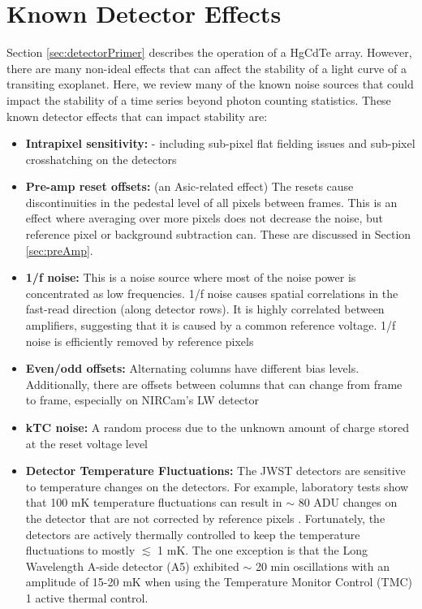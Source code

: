 \documentclass{aastex62}
\begin{document}
\section{Known Detector Effects}\label{sec:knownEffects}
Section \ref{sec:detectorPrimer} describes the operation of a HgCdTe array.
However, there are many non-ideal effects that can affect the stability of a light curve of a transiting exoplanet.
Here, we review many of the known noise sources that could impact the stability of a time series beyond photon counting statistics. These known detector effects that can impact stability are:

\begin{itemize}[noitemsep]
	\item \textbf{Intrapixel sensitivity:} - including sub-pixel flat fielding issues and sub-pixel crosshatching on the detectors \citep{shapiro2018crosshatch}
	\item \textbf{Pre-amp reset offsets:} (an Asic-related effect) 
The resets cause discontinuities in the pedestal level of all pixels between frames. This is an effect where averaging over more pixels does not decrease the noise, but reference pixel or background subtraction can. These are discussed in Section \ref{sec:preAmp}.
	\item \textbf{1/f noise:} This is a noise source where most of the noise power is concentrated as low frequencies. 1/f noise causes spatial correlations in the fast-read direction (along detector rows). It is highly correlated between amplifiers, suggesting that it is caused by a common reference voltage. 1/f noise is efficiently removed by reference pixels
	\item \textbf{Even/odd offsets:} Alternating columns have different bias levels. Additionally, there are offsets between columns that can change from frame to frame, especially on NIRCam's LW detector
	\item \textbf{kTC noise:} A random process due to the unknown amount of charge stored at the reset voltage level
	\item \textbf{Detector Temperature Fluctuations:} The JWST detectors are sensitive to temperature changes on the detectors. For example, laboratory tests show that 100 mK temperature fluctuations can result in $\sim$ 80 ADU changes on the detector that are not corrected by reference pixels \citep{hall2005jwstArrays}. Fortunately, the detectors are actively thermally controlled to keep the temperature fluctuations to mostly $\lesssim$ 1 mK.
The one exception is that the Long Wavelength A-side detector (A5) exhibited $\sim$ 20 min oscillations with an amplitude of 15-20 mK when using the Temperature Monitor Control (TMC) 1 active thermal control.

\end{itemize}
\end{document}
